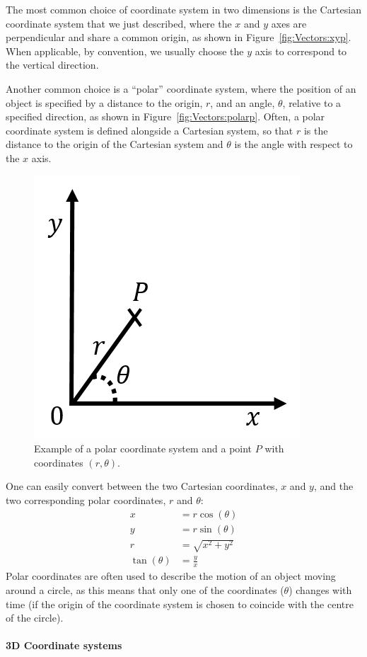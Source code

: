 The most common choice of coordinate system in two dimensions is the Cartesian coordinate system that we just described, where the $x$ and $y$ axes are perpendicular and share a common origin, as shown in Figure~\ref{fig:Vectors:xyp}. When applicable, by convention, we usually choose the $y$ axis to correspond to the vertical direction.

Another common choice is a ``polar'' coordinate system, where the position of an object is specified by a distance to the origin, $r$, and an angle, $\theta$, relative to a specified direction, as shown in Figure~\ref{fig:Vectors:polarp}. Often, a polar coordinate system is defined alongside a Cartesian system, so that $r$ is the distance to the origin of the Cartesian system and $\theta$ is the angle with respect to the $x$ axis.

\begin{figure}[!htbp]
\centering
\includegraphics[width=0.375\linewidth]{files/polarp-b3609563a44566297bf1560f08c6e582.png}
\caption[]{Example of a polar coordinate system and a point $P$ with coordinates $(r,\theta)$.}
\label{fig:Vectors:polarp }
\end{figure}

One can easily convert between the two Cartesian coordinates, $x$ and $y$, and the two corresponding polar coordinates, $r$ and $\theta$:
\begin{align*}
x&=r\cos(\theta)\\
y&=r\sin(\theta)\\
r&=\sqrt{x^2+y^2}\\
\tan(\theta) &= \frac{y}{x}
\end{align*}
Polar coordinates are often used to describe the motion of an object moving around a circle, as this means that only one of the coordinates ($\theta$) changes with time (if the origin of the coordinate system is chosen to coincide with the centre of the circle).

\paragraph{3D Coordinate systems}

